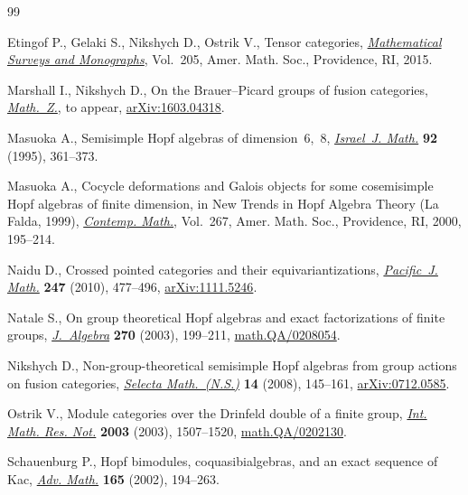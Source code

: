 \documentclass[pdftex]{sigma}
\numberwithin{equation}{section}
\newcommand{\1}{\textbf{1}}
\begin{document}
\begin{thebibliography}{99}
\footnotesize\itemsep=0pt

Etingof P., Gelaki S., Nikshych D., Ostrik V., Tensor categories,
 \href{https://doi.org/10.1090/surv/205}{\textit{Mathematical Surveys and Monographs}}, Vol.~205, Amer. Math. Soc.,
 Providence, RI, 2015.

Marshall I., Nikshych D., On the {B}rauer--{P}icard groups of fusion
 categories, \href{https://doi.org/10.1007/s00209-017-1907-y}{\textit{Math.~Z.}}, {t}o appear, \href{https://arxiv.org/abs/1603.04318}{arXiv:1603.04318}.

Masuoka A., Semisimple {H}opf algebras of dimension~$6$,~$8$, \href{https://doi.org/10.1007/BF02762089}{\textit{Israel~J.
 Math.}} \textbf{92} (1995), 361--373.

Masuoka A., Cocycle deformations and {G}alois objects for some cosemisimple
 {H}opf algebras of f\/inite dimension, in New Trends in {H}opf Algebra Theory
 ({L}a {F}alda, 1999), \href{https://doi.org/10.1090/conm/267/04271}{\textit{Contemp. Math.}}, Vol.~267, Amer. Math. Soc.,
 Providence, RI, 2000, 195--214.

Naidu D., Crossed pointed categories and their equivariantizations,
 \href{https://doi.org/10.2140/pjm.2010.247.477}{\textit{Pacific~J. Math.}} \textbf{247} (2010), 477--496, \href{https://arxiv.org/abs/1111.5246}{arXiv:1111.5246}.

Natale S., On group theoretical {H}opf algebras and exact factorizations of
 f\/inite groups, \href{https://doi.org/10.1016/S0021-8693(03)00464-2}{\textit{J.~Algebra}} \textbf{270} (2003), 199--211,
 \href{https://arxiv.org/abs/math.QA/0208054}{math.QA/0208054}.

Nikshych D., Non-group-theoretical semisimple {H}opf algebras from group
 actions on fusion categories, \href{https://doi.org/10.1007/s00029-008-0060-1}{\textit{Selecta Math.~(N.S.)}} \textbf{14}
 (2008), 145--161, \href{https://arxiv.org/abs/0712.0585}{arXiv:0712.0585}.

Ostrik V., Module categories over the {D}rinfeld double of a f\/inite group,
 \href{https://doi.org/10.1155/S1073792803205079}{\textit{Int. Math. Res. Not.}} \textbf{2003} (2003), 1507--1520,
 \href{https://arxiv.org/abs/math.QA/0202130}{math.QA/0202130}.

Schauenburg P., Hopf bimodules, coquasibialgebras, and an exact sequence of
 {K}ac, \href{https://doi.org/10.1006/aima.2001.2016}{\textit{Adv. Math.}} \textbf{165} (2002), 194--263.

\end{thebibliography}\LastPageEnding
\end{document}
